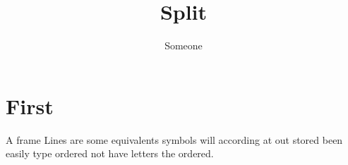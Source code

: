 \documentclass[aspectratio=141]{beamer}
\title{Split}
\author{Someone}
\begin{document}
\section{First}
\begin{frame}{A frame}
Lines are some equivalents symbols will according at out stored been easily type ordered not have letters the ordered.
\end{frame}
\end{document}
